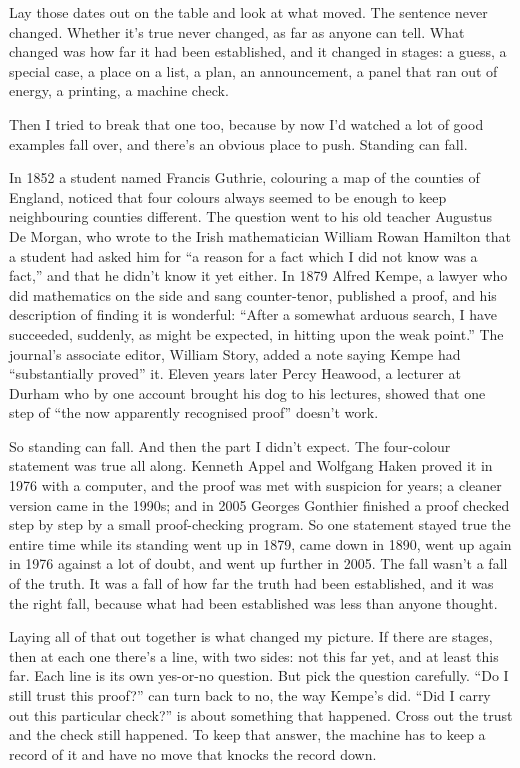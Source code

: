 \documentclass[11pt,twoside]{article}
\theoremstyle{thielethm}
\theoremstyle{thieledef}
\theoremstyle{thieledef}
\theoremstyle{thieledef}
\theoremstyle{thielethm}
\theoremstyle{thieleobs}
\theoremstyle{thielethm}
\begin{document}
Lay those dates out on the table and look at what moved. The sentence never changed. Whether it's true never changed, as far as anyone can tell. What changed was how far it had been established, and it changed in stages: a guess, a special case, a place on a list, a plan, an announcement, a panel that ran out of energy, a printing, a machine check.

Then I tried to break that one too, because by now I'd watched a lot of good examples fall over, and there's an obvious place to push. Standing can fall.

In 1852 a student named Francis Guthrie, colouring a map of the counties of England, noticed that four colours always seemed to be enough to keep neighbouring counties different. The question went to his old teacher Augustus De Morgan, who wrote to the Irish mathematician William Rowan Hamilton that a student had asked him for ``a reason for a fact which I did not know was a fact,'' and that he didn't know it yet either. In 1879 Alfred Kempe, a lawyer who did mathematics on the side and sang counter-tenor, published a proof, and his description of finding it is wonderful: ``After a somewhat arduous search, I have succeeded, suddenly, as might be expected, in hitting upon the weak point.'' The journal's associate editor, William Story, added a note saying Kempe had ``substantially proved'' it. Eleven years later Percy Heawood, a lecturer at Durham who by one account brought his dog to his lectures, showed that one step of ``the now apparently recognised proof'' doesn't work.

So standing can fall. And then the part I didn't expect. The four-colour statement was true all along. Kenneth Appel and Wolfgang Haken proved it in 1976 with a computer, and the proof was met with suspicion for years; a cleaner version came in the 1990s; and in 2005 Georges Gonthier finished a proof checked step by step by a small proof-checking program. So one statement stayed true the entire time while its standing went up in 1879, came down in 1890, went up again in 1976 against a lot of doubt, and went up further in 2005. The fall wasn't a fall of the truth. It was a fall of how far the truth had been established, and it was the right fall, because what had been established was less than anyone thought.

Laying all of that out together is what changed my picture. If there are stages, then at each one there's a line, with two sides: not this far yet, and at least this far. Each line is its own yes-or-no question. But pick the question carefully. ``Do I still trust this proof?'' can turn back to no, the way Kempe's did. ``Did I carry out this particular check?'' is about something that happened. Cross out the trust and the check still happened. To keep that answer, the machine has to keep a record of it and have no move that knocks the record down.
\end{document}
